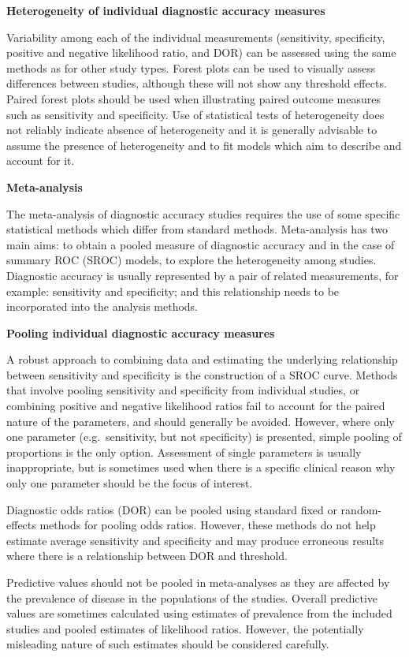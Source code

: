 \documentclass[
  11pt,
  a4paper,
  DIV=11,
  numbers=noendperiod]{scrreprt}
\begin{document}
\textbf{Heterogeneity of individual diagnostic accuracy measures}

Variability among each of the individual measurements (sensitivity,
specificity, positive and negative likelihood ratio, and DOR) can be
assessed using the same methods as for other study types. Forest plots
can be used to visually assess differences between studies, although
these will not show any threshold effects. Paired forest plots should be
used when illustrating paired outcome measures such as sensitivity and
specificity. Use of statistical tests of heterogeneity does not reliably
indicate absence of heterogeneity and it is generally advisable to
assume the presence of heterogeneity and to fit models which aim to
describe and account for it.

\textbf{Meta-analysis}

The meta-analysis of diagnostic accuracy studies requires the use of
some specific statistical methods which differ from standard methods.
Meta-analysis has two main aims: to obtain a pooled measure of
diagnostic accuracy and in the case of summary ROC (SROC) models, to
explore the heterogeneity among studies. Diagnostic accuracy is usually
represented by a pair of related measurements, for example: sensitivity
and specificity; and this relationship needs to be incorporated into the
analysis methods.

\textbf{Pooling individual diagnostic accuracy measures}

A robust approach to combining data and estimating the underlying
relationship between sensitivity and specificity is the construction of
a SROC curve. Methods that involve pooling sensitivity and specificity
from individual studies, or combining positive and negative likelihood
ratios fail to account for the paired nature of the parameters, and
should generally be avoided. However, where only one parameter
(e.g.~sensitivity, but not specificity) is presented, simple pooling of
proportions is the only option. Assessment of single parameters is
usually inappropriate, but is sometimes used when there is a specific
clinical reason why only one parameter should be the focus of interest.

Diagnostic odds ratios (DOR) can be pooled using standard fixed or
random-effects methods for pooling odds ratios. However, these methods
do not help estimate average sensitivity and specificity and may produce
erroneous results where there is a relationship between DOR and
threshold.

Predictive values should not be pooled in meta-analyses as they are
affected by the prevalence of disease in the populations of the studies.
Overall predictive values are sometimes calculated using estimates of
prevalence from the included studies and pooled estimates of likelihood
ratios. However, the potentially misleading nature of such estimates
should be considered carefully.
\end{document}
